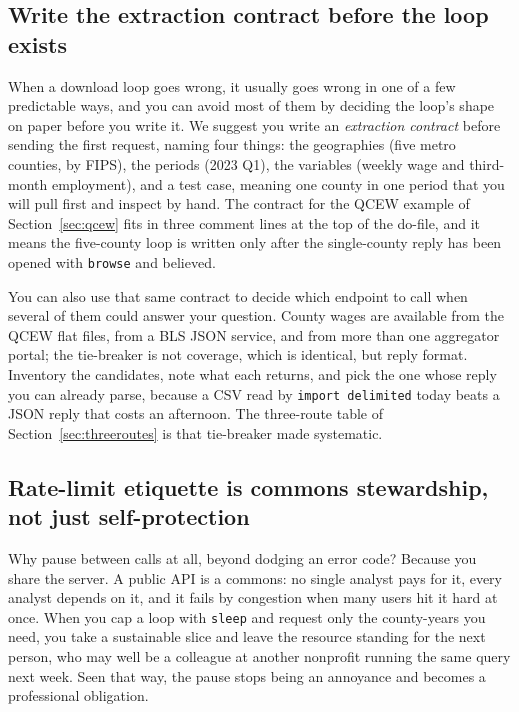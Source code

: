 \documentclass[
    a4paper,
    fontsize=10pt,
    twoside=true,
    numbers=noenddot,
]{kaobook}
\begin{document}
\subsection{Write the extraction contract before the loop exists}\label{ch03-sc-contract}
When a download loop goes wrong, it usually goes wrong in one of a few predictable ways, and you can avoid most of them by deciding the loop's shape on paper before you write it. We suggest you write an \emph{extraction contract} before sending the first request, naming four things: the geographies (five metro counties, by FIPS), the periods (2023 Q1), the variables (weekly wage and third-month employment), and a test case, meaning one county in one period that you will pull first and inspect by hand. The contract for the QCEW example of Section~\ref{sec:qcew} fits in three comment lines at the top of the do-file, and it means the five-county loop is written only after the single-county reply has been opened with \texttt{browse} and believed.

You can also use that same contract to decide which endpoint to call when several of them could answer your question. County wages are available from the QCEW flat files, from a BLS JSON service, and from more than one aggregator portal; the tie-breaker is not coverage, which is identical, but reply format. Inventory the candidates, note what each returns, and pick the one whose reply you can already parse, because a CSV read by \texttt{import delimited} today beats a JSON reply that costs an afternoon. The three-route table of Section~\ref{sec:threeroutes} is that tie-breaker made systematic.

\subsection{Rate-limit etiquette is commons stewardship, not just self-protection}\label{ch03-commons}
Why pause between calls at all, beyond dodging an error code? Because you share the server. A public API is a commons: no single analyst pays for it, every analyst depends on it, and it fails by congestion when many users hit it hard at once. When you cap a loop with \texttt{sleep} and request only the county-years you need, you take a sustainable slice and leave the resource standing for the next person, who may well be a colleague at another nonprofit running the same query next week. Seen that way, the pause stops being an annoyance and becomes a professional obligation.
\end{document}
